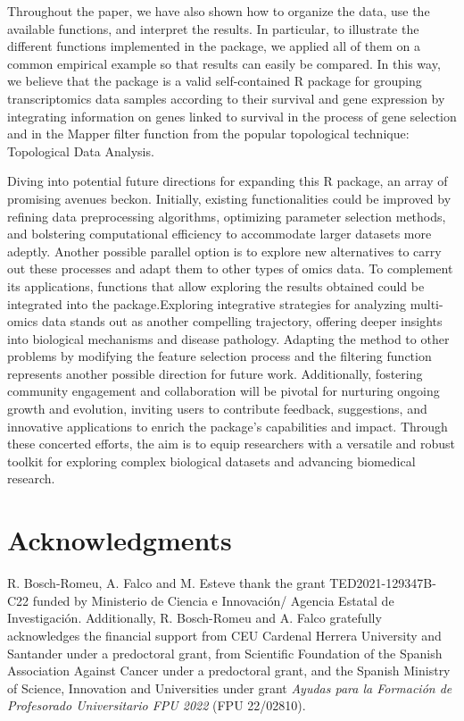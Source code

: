 Throughout the paper, we have also shown how to organize the data, use the available functions, and interpret the results. In particular, to illustrate the different functions implemented in the package, we applied all of them on a common empirical example so that results can easily be compared. In this way, we believe that the  package is a valid self-contained R package for grouping transcriptomics data samples according to their survival and gene expression by integrating information on genes linked to survival in the process of gene selection and in the Mapper filter function from the popular topological technique: Topological Data Analysis.

Diving into potential future directions for expanding this R package, an array of promising avenues beckon. Initially, existing functionalities could be improved by refining data preprocessing algorithms, optimizing parameter selection methods, and bolstering computational efficiency to accommodate larger datasets more adeptly. Another possible parallel option is to explore new alternatives to carry out these processes and adapt them to other types of omics data. To complement its applications, functions that allow exploring the results obtained could be integrated into the package.Exploring integrative strategies for analyzing multi-omics data stands out as another compelling trajectory, offering deeper insights into biological mechanisms and disease pathology. Adapting the method to other problems by modifying the feature selection process and the filtering function represents another possible direction for future work. Additionally, fostering community engagement and collaboration will be pivotal for nurturing ongoing growth and evolution, inviting users to contribute feedback, suggestions, and innovative applications to enrich the package's capabilities and impact. Through these concerted efforts, the aim is to equip researchers with a versatile and robust toolkit for exploring complex biological datasets and advancing biomedical research.

\hypertarget{acknowledgments}{%
\section{Acknowledgments}\label{acknowledgments}}

R. Bosch-Romeu, A. Falco and M. Esteve thank the grant TED2021-129347B-C22 funded by Ministerio de Ciencia e Innovación/ Agencia Estatal de Investigación. Additionally, R. Bosch-Romeu and A. Falco gratefully acknowledges the financial support from CEU Cardenal Herrera University and Santander under a predoctoral grant, from Scientific Foundation of the Spanish Association Against Cancer under a predoctoral grant, and the Spanish Ministry of Science, Innovation and Universities under grant \emph{Ayudas para la Formación de Profesorado Universitario FPU 2022} (FPU 22/02810).




